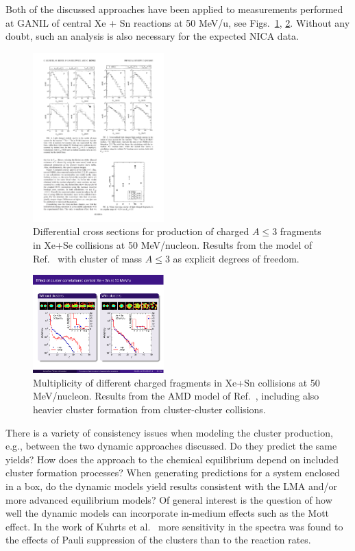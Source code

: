 \documentclass[epj]{svjour}
\begin{document}
Both of the discussed approaches have been applied to measurements performed at GANIL 
of central Xe + Sn reactions at 50 MeV/u, see Figs.~\ref{Fig:Kuhrts}, \ref{Fig:Akira}. 
Without any doubt, such an analysis is also necessary for the expected NICA data.
\begin{figure}[h]
   \includegraphics[width=0.45\textwidth]{Kuhrts.pdf}
    \caption{Differential cross sections for production of charged $A\le 3$ fragments in Xe+Se collisions at 50 MeV/nucleon.
    Results from the model of Ref.~\cite{Kuhrts} with cluster of mass $A\le 3$ as explicit degrees of freedom. 
    \label{Fig:Kuhrts}}    
 \end{figure}
\begin{figure}[h]
   \includegraphics[width=0.45\textwidth]{Ono.pdf}
    \caption{Multiplicity of different charged fragments in Xe+Sn collisions at 50 MeV/nucleon.
    Results from the AMD model of Ref.~\cite{Akira}, including also heavier cluster formation from 
    cluster-cluster collisions.
    \label{Fig:Akira}}    
 \end{figure}

There is a variety of consistency issues when modeling the cluster production, e.g., between the two dynamic approaches discussed.
Do they predict the same yields?
How does the approach to the chemical equilibrium depend on included cluster formation processes?
When generating predictions for a system enclosed in a box, do the dynamic models yield results consistent with the LMA and/or more advanced equilibrium models?
Of general interest is the question of how well the dynamic models can incorporate in-medium effects such as the Mott effect.
In the work of Kuhrts et al.~\cite{Kuhrts} more sensitivity in the spectra was found to the effects of Pauli suppression of the clusters than to the reaction rates.
\end{document}
